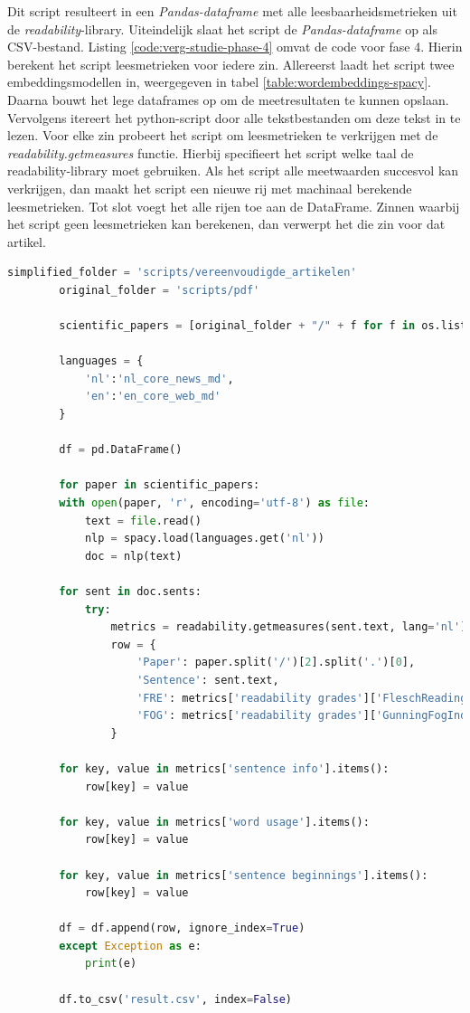 Dit script resulteert in een \textit{Pandas-dataframe} met alle leesbaarheidsmetrieken uit de \textit{readability}-library. Uiteindelijk slaat het script de \textit{Pandas-dataframe} op als CSV-bestand. Listing \ref{code:verg-studie-phase-4} omvat de code voor fase 4. Hierin berekent het script leesmetrieken voor iedere zin. Allereerst laadt het script twee embeddingsmodellen in, weergegeven in tabel \ref{table:wordembeddings-spacy}. Daarna bouwt het lege dataframes op om de meetresultaten te kunnen opslaan. Vervolgens itereert het python-script door alle tekstbestanden om deze tekst in te lezen. Voor elke zin probeert het script om leesmetrieken te verkrijgen met de \textit{readability.getmeasures} functie. Hierbij specifieert het script welke taal de readability-library moet gebruiken. Als het script alle meetwaarden succesvol kan verkrijgen, dan maakt het script een nieuwe rij met machinaal berekende leesmetrieken. Tot slot voegt het alle rijen toe aan de DataFrame. Zinnen waarbij het script geen leesmetrieken kan berekenen, dan verwerpt het die zin voor dat artikel.

\begin{center}
	\begin{lstlisting}[language=Python, caption={Script voor de vierde fase van de vergelijkende studie}, label={code:verg-studie-phase-4}]	
		simplified_folder = 'scripts/vereenvoudigde_artikelen'
		original_folder = 'scripts/pdf'
		
		scientific_papers = [original_folder + "/" + f for f in os.listdir(original_folder)] + [simplified_folder + "/" + f for f in os.listdir(simplified_folder)]
		
		languages = {
			'nl':'nl_core_news_md',
			'en':'en_core_web_md'
		}
		
		df = pd.DataFrame()
		
		for paper in scientific_papers:
		with open(paper, 'r', encoding='utf-8') as file:
			text = file.read()
			nlp = spacy.load(languages.get('nl'))
			doc = nlp(text)
		
		for sent in doc.sents:
			try:
				metrics = readability.getmeasures(sent.text, lang='nl')
				row = {
					'Paper': paper.split('/')[2].split('.')[0],
					'Sentence': sent.text,
					'FRE': metrics['readability grades']['FleschReadingEase'],
					'FOG': metrics['readability grades']['GunningFogIndex'],
				}
		
		for key, value in metrics['sentence info'].items():
			row[key] = value
		
		for key, value in metrics['word usage'].items():
			row[key] = value
		
		for key, value in metrics['sentence beginnings'].items():
			row[key] = value
			
		df = df.append(row, ignore_index=True)
		except Exception as e:
			print(e)
		
		df.to_csv('result.csv', index=False)
	\end{lstlisting}
\end{center}

